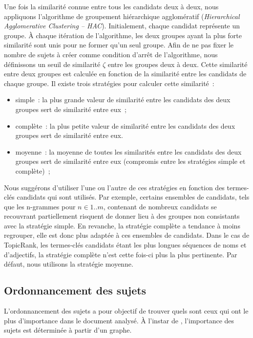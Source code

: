     Une fois la similarité connue entre tous les candidats deux à deux, nous
    appliquons l'algorithme de groupement hiérarchique agglomératif
    (\textit{Hierarchical Agglomerative Clustering -- HAC}). Initialement,
    chaque candidat représente un groupe. À chaque itération de l'algorithme,
    les deux groupes ayant la plus forte similarité sont unis pour ne former
    qu'un seul groupe. Afin de ne pas fixer le nombre de sujets à créer comme
    condition d'arrêt de l'algorithme, nous définissons un seuil de similarité
    $\zeta$ entre les groupes deux à deux. Cette similarité entre deux groupes
    est calculée en fonction de la similarité entre les candidats de chaque
    groupe. Il existe trois stratégies pour calculer cette similarité~:
    \begin{itemize}
      \item{simple~: la plus grande valeur de similarité entre les candidats
            des deux groupes sert de similarité entre eux~;}
      \item{complète~: la plus petite valeur de similarité entre les candidats
            des deux groupes sert de similarité entre eux.}
      \item{moyenne~: la moyenne de toutes les similarités entre les
            candidats des deux groupes sert de similarité entre eux (compromis
            entre les stratégies simple et complète)~;}
    \end{itemize}
    Nous suggérons d'utiliser l'une ou l'autre de ces stratégies en fonction des
    termes-clés candidats qui sont utilisés. Par exemple, certains ensembles de
    candidats, tels que les n-grammes pour $n \in 1..m$,
    contenant de nombreux candidats se recouvrant partiellement risquent de
    donner lieu à des groupes non consistants avec la stratégie simple. En
    revanche, la stratégie complète a tendance à moins regrouper, elle est donc
    plus adaptée à ces ensembles de candidats. Dans le cas de TopicRank, les
    termes-clés candidats étant les plus longues séquences de noms et
    d'adjectifs, la stratégie complète n'est cette fois-ci plus la plus
    pertinente. Par défaut, nous utilisons la stratégie moyenne.

  \subsection{Ordonnancement des sujets}
  \label{subsec:ordonnancement_des_sujets}
    L'ordonnancement des sujets a pour objectif de trouver quels sont ceux qui
    ont le plus d'importance dans le document analysé. À l'instar de
    , l'importance des sujets est déterminée à
    partir d'un graphe.

